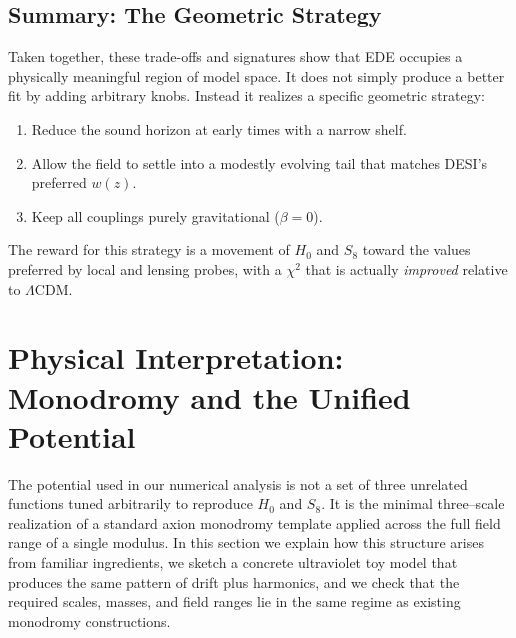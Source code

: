 \documentclass[a4paper,11pt]{article}
\begin{document}

\subsection{Summary: The Geometric Strategy}
\label{sec:geometric_summary}

Taken together, these trade-offs and signatures show that EDE occupies a physically meaningful region of model space. It does not simply produce a better fit by adding arbitrary knobs. Instead it realizes a specific geometric strategy:
\begin{enumerate}
    \item Reduce the sound horizon at early times with a narrow shelf.
    \item Allow the field to settle into a modestly evolving tail that matches DESI's preferred $w(z)$.
    \item Keep all couplings purely gravitational ($\beta = 0$).
\end{enumerate}

The reward for this strategy is a movement of $H_0$ and $S_8$ toward the values preferred by local and lensing probes, with a $\chi^2$ that is actually \emph{improved} relative to $\Lambda$CDM.


\section{Physical Interpretation: Monodromy and the Unified Potential}

The potential used in our numerical analysis is not a set of three unrelated functions tuned arbitrarily to reproduce $H_0$ and $S_8$. It is the minimal three–scale realization of a standard axion monodromy template applied across the full field range of a single modulus. In this section we explain how this structure arises from familiar ingredients, we sketch a concrete ultraviolet toy model that produces the same pattern of drift plus harmonics, and we check that the required scales, masses, and field ranges lie in the same regime as existing monodromy constructions.
\end{document}
